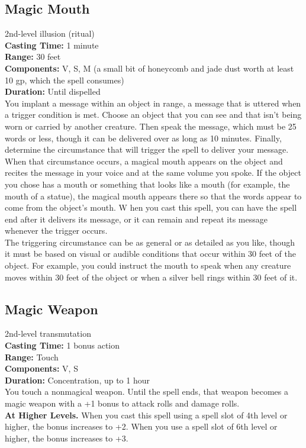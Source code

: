 \documentclass[11pt, A4paper, english]{article}
\begin{document}
		\subsection{Magic Mouth}
2nd-level illusion (ritual) \\
\textbf{Casting Time:} 1 minute \\
\textbf{Range:} 30 feet \\
\textbf{Components:} V, S, M (a small bit of honeycomb and jade dust worth at least 10 gp, which the spell consumes) \\
\textbf{Duration:} Until dispelled \\
You implant a message within an object in range, a message that is uttered when a trigger condition is met. Choose an object that you can see and that isn’t being worn or carried by another creature. Then speak the message, which must be 25 words or less, though it can be delivered over as long as 10 minutes. Finally, determine the circumstance that will trigger the spell to deliver your message. \\
When that circumstance occurs, a magical mouth appears on the object and recites the message in your voice and at the same volume you spoke. If the object you chose has a mouth or something that looks like a mouth (for example, the mouth of a statue), the magical mouth appears there so that the words appear to come from the object’s mouth. W hen you cast this spell, you can have the spell end after it delivers its message, or it can remain and repeat its message whenever the trigger occurs. \\
The triggering circumstance can be as general or as detailed as you like, though it must be based on visual or audible conditions that occur within 30 feet of the object. For example, you could instruct the mouth to speak when any creature moves within 30 feet of the object or when a silver bell rings within 30 feet of it.

		\subsection{Magic Weapon}
2nd-level transmutation \\
\textbf{Casting Time:} 1 bonus action \\
\textbf{Range:} Touch \\
\textbf{Components:} V, S \\
\textbf{Duration:} Concentration, up to 1 hour \\
You touch a nonmagical weapon. Until the spell ends, that weapon becomes a magic weapon with a +1 bonus to attack rolls and damage rolls. \\
\textbf{At Higher Levels.} When you cast this spell using a spell slot of 4th level or higher, the bonus increases to +2. When you use a spell slot of 6th level or higher, the bonus increases to +3.
\end{document}
